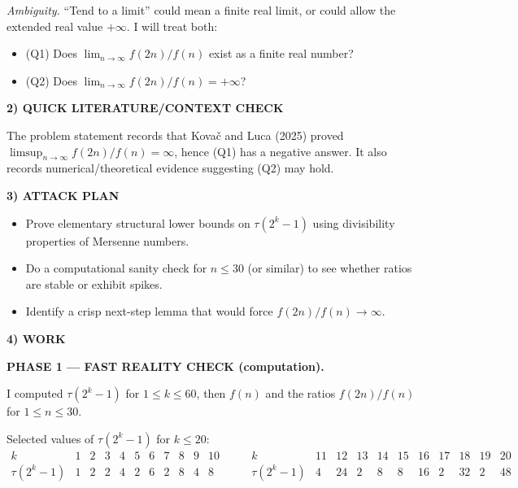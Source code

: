 \emph{Ambiguity.} “Tend to a limit” could mean a finite real limit, or could
allow the extended real value $+\infty$. I will treat both:

\begin{itemize}
\item (Q1) Does $\lim_{n\to\infty} f(2n)/f(n)$ exist as a finite real number?
\item (Q2) Does $\lim_{n\to\infty} f(2n)/f(n)=+\infty$?
\end{itemize}

\medskip
\noindent\textbf{2) QUICK LITERATURE/CONTEXT CHECK}

The problem statement records that Kova\v{c} and Luca (2025) proved
$\limsup_{n\to\infty} f(2n)/f(n)=\infty$, hence (Q1) has a negative answer.
It also records numerical/theoretical evidence suggesting (Q2) may hold.

\medskip
\noindent\textbf{3) ATTACK PLAN}

\begin{itemize}
\item Prove elementary structural lower bounds on $\tau(2^k-1)$ using divisibility
properties of Mersenne numbers.
\item Do a computational sanity check for $n\le 30$ (or similar) to see whether
ratios are stable or exhibit spikes.
\item Identify a crisp next-step lemma that would force $f(2n)/f(n)\to\infty$.
\end{itemize}

\medskip
\noindent\textbf{4) WORK}

\textbf{PHASE 1 — FAST REALITY CHECK (computation).}

I computed $\tau(2^k-1)$ for $1\le k\le 60$, then $f(n)$ and the ratios
$f(2n)/f(n)$ for $1\le n\le 30$.

Selected values of $\tau(2^k-1)$ for $k\le 20$:
\[
\begin{array}{c|cccccccccc}
 k &1&2&3&4&5&6&7&8&9&10\\\hline
 \tau(2^k-1) &1&2&2&4&2&6&2&8&4&8
\end{array}
\qquad
\begin{array}{c|cccccccccc}
 k &11&12&13&14&15&16&17&18&19&20\\\hline
 \tau(2^k-1) &4&24&2&8&8&16&2&32&2&48
\end{array}
\]

